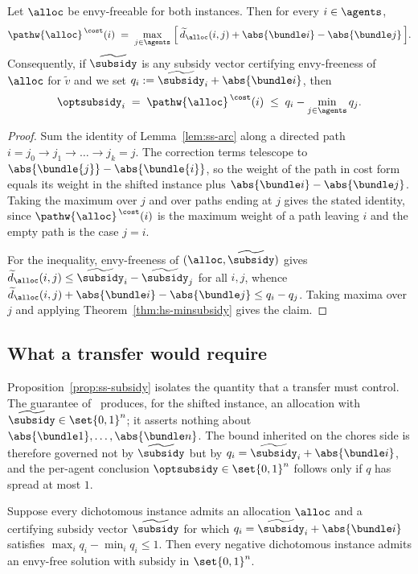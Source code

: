 \begin{proposition}
\label{prop:ss-subsidy}
Let $\alloc$ be envy-freeable for both instances. Then for every $i \in \agents$,
\[
  \pathw{\alloc}^{\,\cost}(i)
  \;=\; \max_{j \in \agents}\;
        \Bigl[\, \widetilde{d}_{\alloc}(i,j)
              + \abs{\bundle i} - \abs{\bundle j} \,\Bigr].
\]
Consequently, if $\widetilde{\subsidy}$ is any subsidy vector certifying
envy-freeness of $\alloc$ for $\widetilde{v}$ and we set
$q_i := \widetilde{\subsidy}_i + \abs{\bundle i}$, then
\[
  \optsubsidy_i \;=\; \pathw{\alloc}^{\,\cost}(i)
  \;\le\; q_i - \min_{j \in \agents} q_j .
\]
\end{proposition}

\begin{proof}
Sum the identity of Lemma~\ref{lem:ss-arc} along a directed path
$i = j_0 \to j_1 \to \dots \to j_k = j$. The correction terms telescope to
$\abs{\bundle{j}} - \abs{\bundle{i}}$, so the weight of the path in cost form
equals its weight in the shifted instance plus
$\abs{\bundle i} - \abs{\bundle j}$. Taking the maximum over $j$ and over paths
ending at $j$ gives the stated identity, since
$\pathw{\alloc}^{\,\cost}(i)$ is the maximum weight of a path leaving $i$ and
the empty path is the case $j=i$.

For the inequality, envy-freeness of $(\alloc,\widetilde{\subsidy})$ gives
$\widetilde{d}_{\alloc}(i,j) \le \widetilde{\subsidy}_i - \widetilde{\subsidy}_j$
for all $i,j$, whence
$\widetilde{d}_{\alloc}(i,j) + \abs{\bundle i} - \abs{\bundle j} \le q_i - q_j$.
Taking maxima over $j$ and applying
Theorem~\ref{thm:hs-minsubsidy} gives the claim.
\end{proof}

\subsection{What a transfer would require}

Proposition~\ref{prop:ss-subsidy} isolates the quantity that a transfer must
control. The guarantee of~\cite{BKNS22} produces, for the shifted instance, an
allocation with $\widetilde{\subsidy} \in \set{0,1}^n$; it asserts nothing about
$\abs{\bundle 1},\dots,\abs{\bundle n}$. The bound inherited on the chores side
is therefore governed not by $\widetilde{\subsidy}$ but by
$q_i = \widetilde{\subsidy}_i + \abs{\bundle i}$, and the per-agent conclusion
$\optsubsidy \in \set{0,1}^n$ follows only if $q$ has spread at most $1$.

\begin{proposition}
\label{prop:ss-target}
Suppose every dichotomous instance admits an allocation $\alloc$ and a
certifying subsidy vector $\widetilde{\subsidy}$ for which
$q_i = \widetilde{\subsidy}_i + \abs{\bundle i}$ satisfies
$\max_i q_i - \min_i q_i \le 1$. Then every negative dichotomous instance
admits an envy-free solution with subsidy in $\set{0,1}^n$.
\end{proposition}


